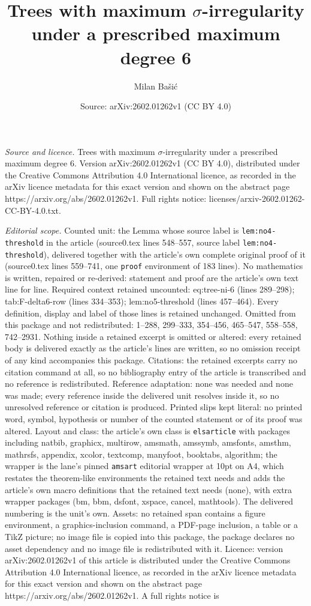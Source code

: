 \documentclass[10pt,a4paper]{amsart}
\title[Trees with maximum $\sigma$-irregularity under a prescribed ]{Trees with maximum $\sigma$-irregularity under a prescribed maximum degree 6}
\author{Milan Ba\v{s}i\'c}
\date{Source: arXiv:2602.01262v1 (CC BY 4.0)}
\begin{document}
\maketitle

\noindent\emph{Source and licence.} Trees with maximum $\sigma$-irregularity under a prescribed maximum degree 6. Version arXiv:2602.01262v1 (CC BY 4.0), distributed under the Creative Commons Attribution 4.0 International licence, as recorded in the arXiv licence metadata for this exact version and shown on the abstract page https://arxiv.org/abs/2602.01262v1. Full rights notice: licenses/arxiv-2602.01262-CC-BY-4.0.txt.\par\smallskip

\noindent\textit{Editorial scope.} Counted unit: the Lemma whose source label is \texttt{lem:no4-threshold} in the article (source0.tex lines 548--557, source label \texttt{lem:no4-threshold}), delivered together with the article's own complete original proof of it (source0.tex lines 559--741, one \texttt{proof} environment of 183 lines). No mathematics is written, repaired or re-derived: statement and proof are the article's own text line for line. Required context retained uncounted: eq:tree-ni-6 (lines 289--298); tab:F-delta6-row (lines 334--353); lem:no5-threshold (lines 457--464). Every definition, display and label of those lines is retained unchanged. Omitted from this package and not redistributed: 1--288, 299--333, 354--456, 465--547, 558--558, 742--2931. Nothing inside a retained excerpt is omitted or altered: every retained body is delivered exactly as the article's lines are written, so no omission receipt of any kind accompanies this package. Citations: the retained excerpts carry no citation command at all, so no bibliography entry of the article is transcribed and no reference is redistributed. Reference adaptation: none was needed and none was made; every reference inside the delivered unit resolves inside it, so no unresolved reference or citation is produced. Printed slips kept literal: no printed word, symbol, hypothesis or number of the counted statement or of its proof was altered. Layout and class: the article's own class is \texttt{elsarticle} with packages including natbib, graphicx, multirow, amsmath, amssymb, amsfonts, amsthm, mathrsfs, appendix, xcolor, textcomp, manyfoot, booktabs, algorithm; the wrapper is the lane's pinned \texttt{amsart} editorial wrapper at 10pt on A4, which restates the theorem-like environments the retained text needs and adds the article's own macro definitions that the retained text needs (none), with extra wrapper packages (bm, bbm, dsfont, xspace, cancel, mathtools). The delivered numbering is the unit's own. Assets: no retained span contains a figure environment, a graphics-inclusion command, a PDF-page inclusion, a table or a TikZ picture; no image file is copied into this package, the package declares no asset dependency and no image file is redistributed with it. Licence: version arXiv:2602.01262v1 of this article is distributed under the Creative Commons Attribution 4.0 International licence, as recorded in the arXiv licence metadata for this exact version and shown on the abstract page https://arxiv.org/abs/2602.01262v1. A full rights notice is 
\end{document}
